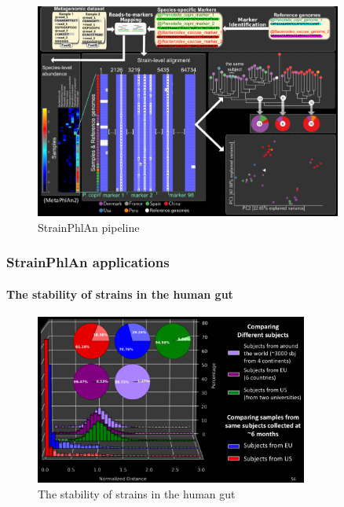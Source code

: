     \begin{figure}[!h]
    \centering
    \includegraphics[width=0.9\textwidth]{StrainPhlAn.png}
    \caption{\label{fig:strainphlan}StrainPhlAn pipeline}
    \end{figure}

        \subsubsection{StrainPhlAn applications}

            \paragraph{The stability of strains in the human gut}

            \begin{figure}[!h]
            \centering
            \includegraphics[width=0.8\textwidth]{strainGut.png}
            \caption{\label{fig:gut}The stability of strains in the human gut}
            \end{figure}

